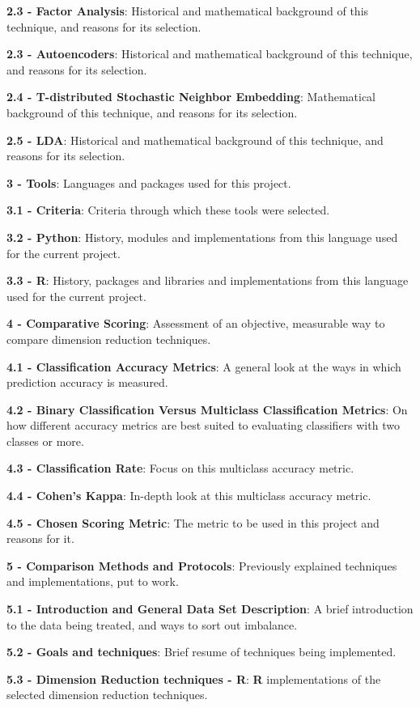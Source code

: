 \documentclass[]{article}
\begin{document}
\textbf{2.3 - Factor Analysis}: Historical and mathematical background
of this technique, and reasons for its selection.

\textbf{2.3 - Autoencoders}: Historical and mathematical background of
this technique, and reasons for its selection.

\textbf{2.4 - T-distributed Stochastic Neighbor Embedding}: Mathematical
background of this technique, and reasons for its selection.

\textbf{2.5 - LDA}: Historical and mathematical background of this
technique, and reasons for its selection.

\textbf{3 - Tools}: Languages and packages used for this project.

\textbf{3.1 - Criteria}: Criteria through which these tools were
selected.

\textbf{3.2 - Python}: History, modules and implementations from this
language used for the current project.

\textbf{3.3 - R}: History, packages and libraries and implementations
from this language used for the current project.

\textbf{4 - Comparative Scoring}: Assessment of an objective, measurable
way to compare dimension reduction techniques.

\textbf{4.1 - Classification Accuracy Metrics}: A general look at the
ways in which prediction accuracy is measured.

\textbf{4.2 - Binary Classification Versus Multiclass Classification
Metrics}: On how different accuracy metrics are best suited to
evaluating classifiers with two classes or more.

\textbf{4.3 - Classification Rate}: Focus on this multiclass accuracy
metric.

\textbf{4.4 - Cohen's Kappa}: In-depth look at this multiclass accuracy
metric.

\textbf{4.5 - Chosen Scoring Metric}: The metric to be used in this
project and reasons for it.

\textbf{5 - Comparison Methods and Protocols}: Previously explained
techniques and implementations, put to work.

\textbf{5.1 - Introduction and General Data Set Description}: A brief
introduction to the data being treated, and ways to sort out imbalance.

\textbf{5.2 - Goals and techniques}: Brief resume of techniques being
implemented.

\textbf{5.3 - Dimension Reduction techniques - R}: \textbf{R}
implementations of the selected dimension reduction techniques.
\end{document}
